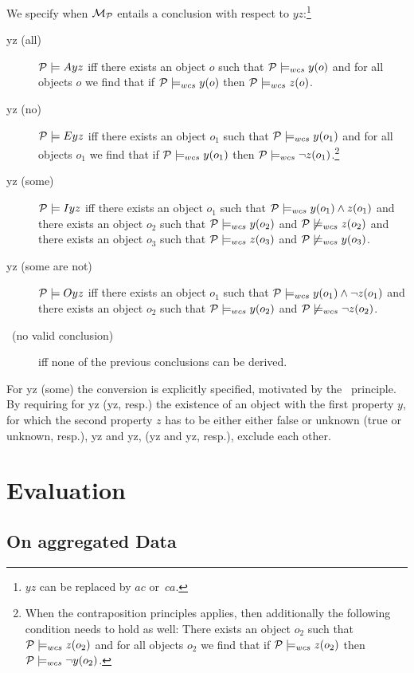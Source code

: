 \documentclass[12pt]{article}
\begin{document}
We specify when ${\cal M}_{\cal P}$ entails a conclusion with respect to $yz$:\footnote{$yz$ can be replaced by $ac$ or~$ca$.}
\begin{description}
\item[\MA yz (all)] ${\cal P} \models Ayz$ iff there exists an object $o$ such that ${\cal P} \models_{wcs}
y(o)$ and for all objects $o$ we find that if ${\cal P} \models_{wcs} y(o)$ then ${\cal P} \models_{wcs} z(o)$.
\item [\ME yz (no)]
${\cal P} \models Eyz$ iff there exists an object $o_1$ such that ${\cal P} \models_{wcs}
y(o_1)$ and for all objects $o_1$ we find that if ${\cal P} \models_{wcs} y(o_1)$ then
${\cal P} \models_{wcs} \neg z(o_1)$.\footnote{
When the contraposition principles applies, then additionally 
the following condition needs to hold as well: There exists an object $o_2$ such that ${\cal P} \models_{wcs}
z(o_2)$ and for all objects $o_2$ we find that if ${\cal P} \models_{wcs} z(o_2)$ then
${\cal P} \models_{wcs} \neg y(o_2)$.}
\item[\MI yz (some)]
${\cal P} \models Iyz$ iff there exists an object $o_1$ such that ${\cal P} \models_{wcs}
y(o_1) \wedge z(o_1)$ and there exists an
object $o_2$ such that ${\cal P} \models_{wcs} y(o_2)$ and
${\cal P} \not\models_{wcs} z(o_2)$ and
there exists an
object $o_3$ such that ${\cal P} \models_{wcs} z(o_3)$ and
${\cal P} \not\models_{wcs} y(o_3)$.
\item[\MO yz (some are not)]
${\cal P} \models Oyz$ iff there exists an object $o_1$ such that ${\cal P} \models_{wcs}
y(o_1) \wedge \neg z(o_1)$ and there exists an
object $o_2$ such that ${\cal P} \models_{wcs} y(o_2)$ and
${\cal P} \not\models_{wcs} \neg z(o_2)$.
\item[\NVC\ (no valid conclusion)] iff none of the previous conclusions can be derived.
\end{description}
For \MI yz (some) the conversion is explicitly specified, motivated by the \converse\ principle.
By requiring for \MI yz (\MO yz, resp.) the existence of an object with the first property $y$,
for which the second property $z$ has to be either either false or unknown (true or unknown, resp.),
\MA yz and \MI yz, (\ME yz and \MO yz, resp.), exclude each other.

\section{Evaluation} \label{sect:aggregateddata}



\subsection{On aggregated Data}
\end{document}
